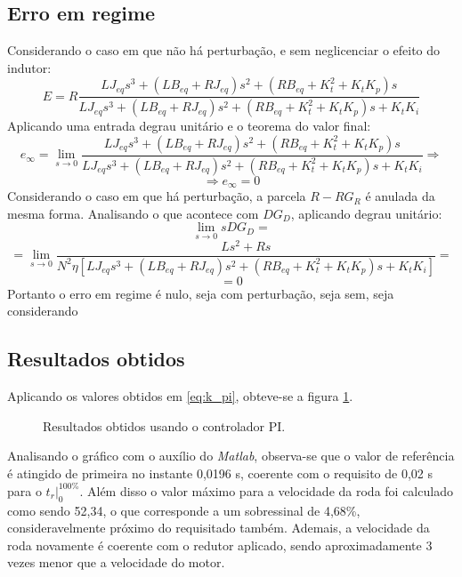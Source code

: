 \documentclass{article}[twocolumn]
\begin{document}
	\subsection{Erro em regime}
	Considerando o caso em que n\~ao h\'a perturba\c{c}\~ao, e sem neglicenciar o efeito do
	indutor:
	\begin{equation}
		E =
		R\frac{LJ_{eq}s^3 + (LB_{eq} + RJ_{eq})s^2 + (RB_{eq} + K_t^2 + K_tK_p)s}
		{LJ_{eq}s^3 + (LB_{eq} + RJ_{eq})s^2 + (RB_{eq} + K_t^2 + K_tK_p)s + K_tK_i}
		\nonumber
	\end{equation}
	Aplicando uma entrada degrau unit\'ario e o teorema do valor final:
	\begin{equation}
		e_\infty = \lim_{s \rightarrow 0}
		\frac{LJ_{eq}s^3 + (LB_{eq} + RJ_{eq})s^2 + (RB_{eq} + K_t^2 + K_tK_p)s}
		{LJ_{eq}s^3 + (LB_{eq} + RJ_{eq})s^2 + (RB_{eq} + K_t^2 + K_tK_p)s + K_tK_i}
		\Rightarrow
		\nonumber
	\end{equation}
	\begin{equation}
		\Rightarrow
		e_\infty = 0
		\nonumber
	\end{equation}
	Considerando o caso em que h\'a perturba\c{c}\~ao, a parcela $R - RG_R$ \'e anulada
	da mesma forma. Analisando o que acontece com $DG_D$, aplicando degrau unit\'ario:
	\begin{equation}
		\lim_{s \rightarrow 0}sDG_D =
		\nonumber
	\end{equation}
	\begin{equation}
		= \lim_{s \rightarrow 0}\frac{Ls^2 + Rs}
		{N^2\eta[LJ_{eq}s^3 + (LB_{eq} + RJ_{eq})s^2 + (RB_{eq} + K_t^2 + K_tK_p)s + K_tK_i]} =
		\nonumber
	\end{equation}
	\begin{equation}
		= 0
		\nonumber
	\end{equation}
	Portanto o erro em regime \'e nulo, seja com perturba\c{c}\~ao, seja sem, seja considerando
	\subsection{Resultados obtidos}
	Aplicando os valores obtidos em \ref{eq:k_pi}, obteve-se a figura
	\ref{fig:res_pi}.
	\begin{figure}[H]
		\centering
		\caption{Resultados obtidos usando o controlador PI.}
		\label{fig:res_pi}
	\end{figure}
	Analisando o gr\'afico com o aux\'ilio do \textit{Matlab}, observa-se que o valor de
	refer\^encia \'e atingido de primeira no instante 0,0196 s, coerente com o requisito
	de 0,02 s para o $t_r\big|_{0}^{100\%}$. Al\'em disso o valor m\'aximo para a velocidade
	da roda foi calculado como sendo 52,34, o que corresponde a um sobressinal de 4,68\%,
	consideravelmente pr\'oximo do requisitado tamb\'em. Ademais, a velocidade da roda novamente
	\'e coerente com o redutor aplicado, sendo aproximadamente 3 vezes menor que a velocidade
	do motor.
\end{document}
